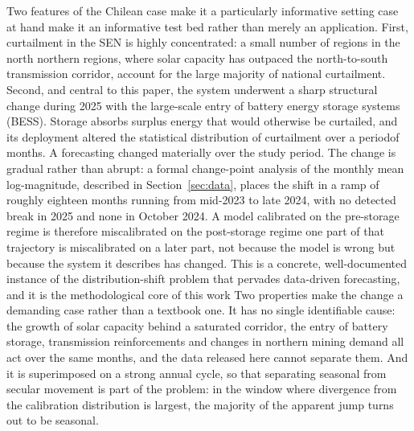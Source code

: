 \documentclass[preprint,3p,times]{elsarticle}
\providecommand{\DIFaddtex}[1]{{\protect\color{blue} \sf #1}} %
\providecommand{\DIFdeltex}[1]{{\protect\color{red} \scriptsize #1}} %
\providecommand{\DIFaddbegin}{} %
\providecommand{\DIFaddend}{} %
\providecommand{\DIFdelbegin}{} %
\providecommand{\DIFdelend}{} %
\providecommand{\DIFadd}[1]{\texorpdfstring{\DIFaddtex{#1}}{#1}} %
\providecommand{\DIFdel}[1]{\texorpdfstring{\DIFdeltex{#1}}{}} %
\begin{document}
Two features of the \DIFdelbegin \DIFdel{Chilean case make it a particularly informative setting}\DIFdelend \DIFaddbegin \DIFadd{case at hand make it an informative test bed rather than merely an application}\DIFaddend . First, curtailment in the SEN is highly concentrated: a small number of \DIFdelbegin \DIFdel{regions in the north}\DIFdelend \DIFaddbegin \DIFadd{northern regions}\DIFaddend , where solar capacity has outpaced the north-to-south transmission corridor, account for the large majority of national curtailment. Second, and central to this paper, the \DIFdelbegin \DIFdel{system underwent a sharp structural change during 2025 with the large-scale entry of battery energy storage systems (BESS). Storage absorbs surplus energy that would otherwise be curtailed, and its deployment altered the }\DIFdelend statistical distribution of curtailment \DIFdelbegin \DIFdel{over a periodof months. A forecasting }\DIFdelend \DIFaddbegin \DIFadd{changed materially over the study period. The change is gradual rather than abrupt: a formal change-point analysis of the monthly mean log-magnitude, described in Section~\ref{sec:data}, places the shift in a ramp of roughly eighteen months running from mid-2023 to late 2024, with no detected break in 2025 and none in October 2024. A }\DIFaddend model calibrated on \DIFdelbegin \DIFdel{the pre-storage regime is therefore miscalibrated on the post-storage regime}\DIFdelend \DIFaddbegin \DIFadd{one part of that trajectory is miscalibrated on a later part}\DIFaddend , not because the model is wrong but because the system it describes has changed. \DIFdelbegin \DIFdel{This is a concrete, well-documented instance of the distribution-shift problem that pervades data-driven forecasting, and it is the methodological core of this work}\DIFdelend \DIFaddbegin \DIFadd{Two properties make the change a demanding case rather than a textbook one. It has no single identifiable cause: the growth of solar capacity behind a saturated corridor, the entry of battery storage, transmission reinforcements and changes in northern mining demand all act over the same months, and the data released here cannot separate them. And it is superimposed on a strong annual cycle, so that separating seasonal from secular movement is part of the problem: in the window where divergence from the calibration distribution is largest, the majority of the apparent jump turns out to be seasonal}\DIFaddend .
\end{document}
